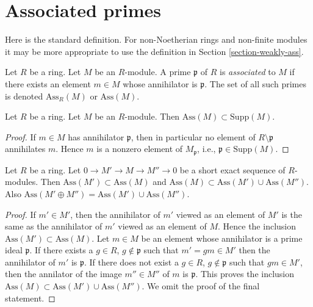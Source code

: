 \section{Associated primes}
\label{section-ass}

\noindent
Here is the standard definition. For non-Noetherian rings and non-finite
modules it may be more appropriate to use the definition in
Section \ref{section-weakly-ass}.

\begin{definition}
\label{definition-associated}
Let $R$ be a ring. Let $M$ be an $R$-module.
A prime $\mathfrak p$ of $R$ is {\it associated} to $M$
if there exists an element $m \in M$ whose annihilator
is $\mathfrak p$.
The set of all such primes is denoted $\text{Ass}_R(M)$
or $\text{Ass}(M)$.
\end{definition}

\begin{lemma}
\label{lemma-ass-support}
Let $R$ be a ring. Let $M$ be an $R$-module.
Then $\text{Ass}(M) \subset \text{Supp}(M)$.
\end{lemma}

\begin{proof}
If $m \in M$ has annihilator $\mathfrak p$, then in particular
no element of $R \setminus \mathfrak p$ annihilates $m$.
Hence $m$ is a nonzero element of $M_{\mathfrak p}$, i.e.,
$\mathfrak p \in \text{Supp}(M)$.
\end{proof}

\begin{lemma}
\label{lemma-ass}
Let $R$ be a ring. Let $0 \to M' \to M \to M'' \to 0$ be a short exact sequence
of $R$-modules. Then $\text{Ass}(M') \subset \text{Ass}(M)$ and
$\text{Ass}(M) \subset \text{Ass}(M') \cup \text{Ass}(M'')$.
Also $\text{Ass}(M' \oplus M'') = \text{Ass}(M') \cup \text{Ass}(M'')$.
\end{lemma}

\begin{proof}
If $m' \in M'$, then the annihilator of $m'$ viewed as an element of $M'$
is the same as the annihilator of $m'$ viewed as an element of $M$. Hence
the inclusion $\text{Ass}(M') \subset \text{Ass}(M)$. Let $m \in M$
be an element whose annihilator is a prime ideal $\mathfrak p$. If there
exists a $g \in R$, $g \not \in \mathfrak p$ such that $m' = gm \in M'$
then the annihilator of $m'$ is $\mathfrak p$. If there does not
exist a $g \in R$, $g \not \in \mathfrak p$ such that $gm \in M'$,
then the annilator of the image $m'' \in M''$ of $m$ is $\mathfrak p$.
This proves the inclusion
$\text{Ass}(M) \subset \text{Ass}(M') \cup \text{Ass}(M'')$.
We omit the proof of the final statement.
\end{proof}

